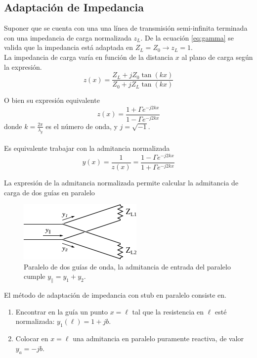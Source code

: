 \documentclass[11pt,a4paper]{article}
\begin{document}
\begin{multicols}{2}
\subsection{Adaptación de Impedancia}

Suponer que se cuenta con una una línea de transmisión semi-infinita terminada con una impedancia de carga normalizada $z_L$.
De la ecuación \ref{eq:gamma} se valida que la impedancia está adaptada en $Z_L = Z_0 \longrightarrow z_L = 1$.\\

La impedancia de carga varía en función de la distancia $x$ al plano de carga según la expresión.\\

\begin{equation*}
    z(x) = \frac{Z_L + j Z_0\tan(kx)}{Z_0 + j Z_L\tan(kx)}
\end{equation*}

O bien su expresión equivalente
\begin{equation*}
    z(x) = \frac{1 + \Gamma e^{-j2kx}}{1 - \Gamma e^{-j2kx}}
\end{equation*}
donde $k=\frac{2\pi}{\lambda_g}$ es el número de onda, y $j=\sqrt{-1}$. \\ \\Es equivalente trabajar con la admitancia normalizada
\begin{equation*}
    y(x) = \frac{1}{z(x)} = \frac{1 - \Gamma e^{-j2kx}}{1 + \Gamma e^{-j2kx}}
\end{equation*}

La expresión de la admitancia normalizada permite calcular la admitancia de carga de dos guías en paralelo
\begin{figure}[H]
    \centering
    \includegraphics[width=0.7\linewidth]{Images/guiapll.pdf}
    \caption{Paralelo de dos guías de onda, la admitancia de entrada del paralelo cumple $y_\parallel = y_1+y_2$.}
    \label{fig:pll}
\end{figure}

El método de adaptación de impedancia con stub en paralelo consiste en. 
\begin{enumerate}
    \item Encontrar en la guía un punto $x = \ell$ tal que la resistencia en $\ell$ esté normalizada: $y_1(\ell)=1+jb$.
    \item Colocar en $x=\ell$ una admitancia en paralelo puramente reactiva, de valor $y_a = -jb$.
\end{enumerate}


\end{multicols}
\end{document}
